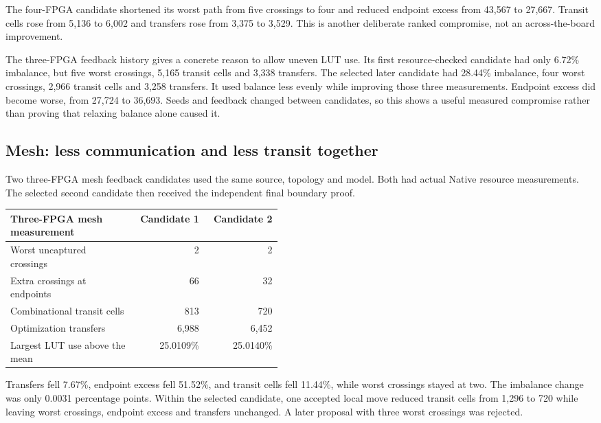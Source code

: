 \documentclass[11pt]{article}
\begin{document}
The four-FPGA candidate shortened its worst path from five crossings to four and reduced endpoint excess from 43,567 to 27,667. Transit cells rose from 5,136 to 6,002 and transfers rose from 3,375 to 3,529. This is another deliberate ranked compromise, not an across-the-board improvement.

The three-FPGA feedback history gives a concrete reason to allow uneven LUT use. Its first resource-checked candidate had only 6.72\% imbalance, but five worst crossings, 5,165 transit cells and 3,338 transfers. The selected later candidate had 28.44\% imbalance, four worst crossings, 2,966 transit cells and 3,258 transfers. It used balance less evenly while improving those three measurements. Endpoint excess did become worse, from 27,724 to 36,693. Seeds and feedback changed between candidates, so this shows a useful measured compromise rather than proving that relaxing balance alone caused it.

\subsection{Mesh: less communication and less transit together}

Two three-FPGA mesh feedback candidates used the same source, topology and model. Both had actual Native resource measurements. The selected second candidate then received the independent final boundary proof.
\begin{center}\small
\begin{tabular}{p{0.46\linewidth}rr}
\toprule
Three-FPGA mesh measurement & Candidate 1 & Candidate 2\\
\midrule
Worst uncaptured crossings & 2 & 2\\
Extra crossings at endpoints & 66 & 32\\
Combinational transit cells & 813 & 720\\
Optimization transfers & 6,988 & 6,452\\
Largest LUT use above the mean & 25.0109\% & 25.0140\%\\
\bottomrule
\end{tabular}
\end{center}
Transfers fell 7.67\%, endpoint excess fell 51.52\%, and transit cells fell 11.44\%, while worst crossings stayed at two. The imbalance change was only 0.0031 percentage points. Within the selected candidate, one accepted local move reduced transit cells from 1,296 to 720 while leaving worst crossings, endpoint excess and transfers unchanged. A later proposal with three worst crossings was rejected.
\end{document}
